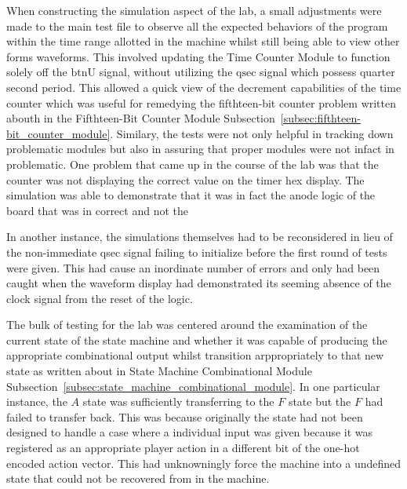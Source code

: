 \documentclass[stu,12pt,floatsintext]{apa7}
\begin{document}
%
%

%
%

When constructing the simulation aspect of the lab, a small adjustments were made to the main test file to observe all the expected behaviors of the program within the time range allotted in the machine whilst still being able to view other forms waveforms. This involved updating the Time Counter Module to function solely off the \(\text{btnU}\) signal, without utilizing the \(\text{qsec}\) signal which possess quarter second period. This allowed a quick view of the decrement capabilities of the time counter which was useful for remedying the fifthteen-bit counter problem written abouth in the Fifthteen-Bit Counter Module Subsection~\ref{subsec:fifthteen-bit_counter_module}. Similary, the tests were not only helpful in tracking down problematic modules but also in assuring that proper modules were not infact in problematic. One problem that came up in the course of the lab was that the counter was not displaying the correct value on the timer hex display. The simulation was able to demonstrate that it was in fact the anode logic of the board that was in correct and not the

In another instance, the simulations themselves had to be reconsidered in lieu of the non-immediate qsec signal failing to initialize before the first round of tests were given. This had cause an inordinate number of errors and only had been caught when the waveform display had demonstrated its seeming absence of the clock signal from the reset of the logic. 

The bulk of testing for the lab was centered around the examination of the current state of the state machine and whether it was capable of producing the appropriate combinational output whilst transition arppropriately to that new state as written about in State Machine Combinational Module Subsection~\ref{subsec:state_machine_combinational_module}. In one particular instance, the \(A\) state was sufficiently transferring to the \(F\) state but the \(F\) had failed to transfer back. This was because originally the state had not been designed to handle a case where a individual input was given because it was registered as an appropriate player action in a different bit of the one-hot encoded action vector. This had unknowningly force the machine into a undefined state that could not be recovered from in the machine.
\end{document}
